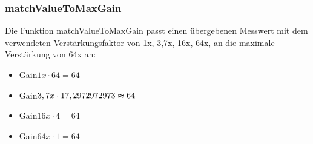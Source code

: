 \subsubsection{matchValueToMaxGain}
Die Funktion matchValueToMaxGain passt einen übergebenen Messwert mit dem verwendeten Verstärkungsfaktor von 1x, 3,7x, 16x, 64x, an die maximale Verstärkung von 64x an:
\begin{itemize}
	\item Gain$ 1x \cdot 64 = 64 $ 
	\item Gain$ 3,7x \cdot 17,2972972973 \thickapprox 64 $ 
	\item Gain$ 16x \cdot 4 = 64 $ 
	\item Gain$ 64x \cdot 1 = 64 $ 
\end{itemize}
